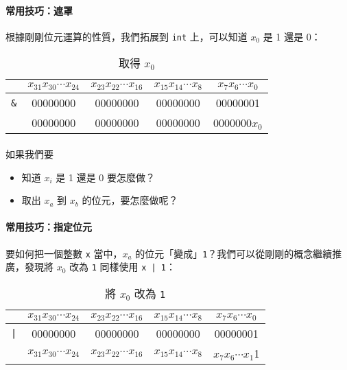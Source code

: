 \documentclass[12pt,a4paper,oneside]{report}
\begin{document}
\begin{CJK}{UTF8}{bkai}
\paragraph{常用技巧：遮罩}根據剛剛位元運算的性質，我們拓展到 \lstinline!int! 上，可以知道 $x_0$ 是 1 還是 0：

\begin{table}[h!]
\centering
\begin{tabular}{|c|c|c|c|c|}
\hline
 & $x_{31}x_{30}\cdots{x_{24}}$ & $x_{23}x_{22}\cdots{x_{16}}$ & $x_{15}x_{14}\cdots{x_{8}}$ & $x_{7}x_{6}\cdots{x_{0}}$\\
\hline
\lstinline!&! & 00000000 & 00000000 & 00000000 & 0000000{\color{red}1}\\
\hline
\hline
 & 00000000 & 00000000 & 00000000 & 0000000\textbf{$x_0$}\\
\hline
\end{tabular}
\caption{取得 $x_0$}
\label{basic:cpp:table:mask}
\end{table}

\paragraph{}如果我們要
\begin{itemize}
\item 知道 $x_i$ 是 1 還是 0 要怎麼做？
\item 取出 $x_a$ 到 $x_b$ 的位元，要怎麼做呢？
\end{itemize}

\paragraph{常用技巧：指定位元}要如何把一個整數 \lstinline!x! 當中，$x_a$ 的位元「變成」\lstinline!1!？我們可以從剛剛的概念繼續推廣，發現將 $x_0$ 改為 \lstinline!1! 同樣使用 \lstinline!x | 1!：

\begin{table}[h!]
\centering
\begin{tabular}{|c|c|c|c|c|}
\hline
 & $x_{31}x_{30}\cdots{x_{24}}$ & $x_{23}x_{22}\cdots{x_{16}}$ & $x_{15}x_{14}\cdots{x_{8}}$ & $x_{7}x_{6}\cdots{x_{0}}$\\
\hline
\lstinline!|! & 00000000 & 00000000 & 00000000 & 0000000{\color{red}1}\\
\hline\hline
 & $x_{31}x_{30}\cdots{x_{24}}$ & $x_{23}x_{22}\cdots{x_{16}}$ & $x_{15}x_{14}\cdots{x_{8}}$ & $x_{7}x_{6}\cdots{x_{1}}${\color{red}1}\\
\hline
\end{tabular}
\caption{將 $x_0$ 改為 \lstinline!1!}
\label{basic:cpp:table:setbit:x0}
\end{table}


\end{CJK}
\end{document}
